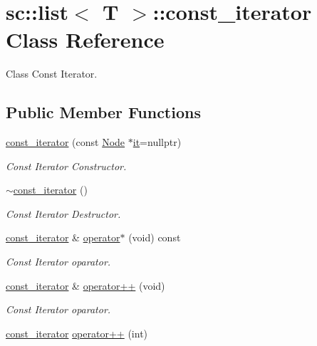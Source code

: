 \hypertarget{classsc_1_1list_1_1const__iterator}{}\section{sc\+:\+:list$<$ T $>$\+:\+:const\+\_\+iterator Class Reference}
\label{classsc_1_1list_1_1const__iterator}


Class Const Iterator.  


\subsection*{Public Member Functions}
\begin{DoxyCompactItemize}
\item 
\hyperlink{classsc_1_1list_1_1const__iterator_a753ed04268e9dd2cea38a765eff349d2}{const\+\_\+iterator} (const \hyperlink{structsc_1_1list_1_1_node}{Node} $\ast$\hyperlink{classsc_1_1list_1_1const__iterator_a9fe1633dfc296c9c1f61ac24d515e648}{it}=nullptr)
\begin{DoxyCompactList}\small\item\em Const Iterator Constructor. \end{DoxyCompactList}\item 
\hyperlink{classsc_1_1list_1_1const__iterator_a8ef9a290e31090f1366403626bdbab1c}{$\sim$const\+\_\+iterator} ()
\begin{DoxyCompactList}\small\item\em Const Iterator Destructor. \end{DoxyCompactList}\item 
\hyperlink{classsc_1_1list_1_1const__iterator}{const\+\_\+iterator} \& \hyperlink{classsc_1_1list_1_1const__iterator_a170e1fec1338708e689c1463f7cf0937}{operator$\ast$} (void) const
\begin{DoxyCompactList}\small\item\em Const Iterator oparator. \end{DoxyCompactList}\item 
\hyperlink{classsc_1_1list_1_1const__iterator}{const\+\_\+iterator} \& \hyperlink{classsc_1_1list_1_1const__iterator_acc27bef3f35dfdaf23fc43b139d74022}{operator++} (void)
\begin{DoxyCompactList}\small\item\em Const Iterator oparator. \end{DoxyCompactList}\item 
\hyperlink{classsc_1_1list_1_1const__iterator}{const\+\_\+iterator} \hyperlink{classsc_1_1list_1_1const__iterator_a7f659a312caded356c8d7eb99437e524}{operator++} (int)

\end{DoxyCompactItemize}
